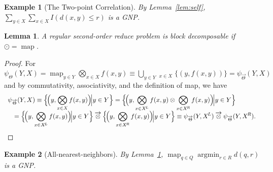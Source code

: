 \documentclass{article}
\newtheorem{lemma}{Lemma}
\newtheorem{example} {Example}
\newcommand{\killspace}{\vspace{-0.08in}}
\newcommand{\GNP}[1][\psi]{{#1}_{\Theta}}
\newcommand{\GNPvec}[1][\psi]{{#1}_{\overrightarrow{\Theta}}}
\newcommand{\otimesvec}{\mathbin{\overrightarrow{\otimes}}}
\newcommand{\bigotimesvec}{\mathop{\overrightarrow{\bigotimes}}}
\DeclareMathOperator*{\argmin}{argmin}
\DeclareMathOperator*{\map}{map}
\newcommand{\kdleft}[1]{#1^{\!L}}
\newcommand{\kdright}[1]{#1^{\!R}}
\begin{document}
\begin{example}[The Two-point Correlation]
  By Lemma~\ref{lem:self}, $\sum_{y \in X} \sum_{x \in X} I(d(x,y)
  \leq r)$ is a GNP.
\end{example}

\begin{lemma}\label{lem:map}
  A regular second-order reduce problem is block decomposable if
  $\odot = \map$.
\end{lemma}
\killspace
\killspace
\begin{proof}
  For $\GNP(Y,X) = \map_{y \in Y} \bigotimes_{x \in X} f(x,y) \equiv
  \bigcup_{y \in Y} \bigotimesvec_{x \in X} \{(y,f(x,y))\} =
  \GNPvec(Y,X)$ and by commutativity, associativity, and the
  definition of map, we have
  \[ \begin{array}{ll}
    \multicolumn{2}{l}{\displaystyle \GNPvec(Y,X) \equiv \Big\{ \!\Big( y,\bigotimes_{x \in X} f(x,y) \Big)\! \Big| y \in Y \Big\} = \Big\{ \!\Big( y,\bigotimes_{x \in \kdleft{X}} f(x,y) \otimes \bigotimes_{x \in \kdright{X}} f(x,y) \Big)\! \Big| y \in Y \Big\}} \\
    & \displaystyle = \Big\{ \!\Big( y,\bigotimes_{x \in \kdleft{X}} f(x,y) \Big)\! \Big| y \in Y \Big\} \otimesvec \Big\{ \!\Big( y,\bigotimes_{x \in \kdright{X}} f(x,y) \Big)\! \Big| y \in Y \Big\} \equiv \GNPvec(Y,\kdleft{X}) \otimesvec \GNPvec(Y,\kdright{X}).
  \end{array} \]
\end{proof}
\killspace
\begin{example}[All-nearest-neighbors]
  By Lemma~\ref{lem:map}, $\map_{q \in Q} \argmin_{r \in R} d(q,r)$ is
  a GNP.
\end{example}

\end{document}
